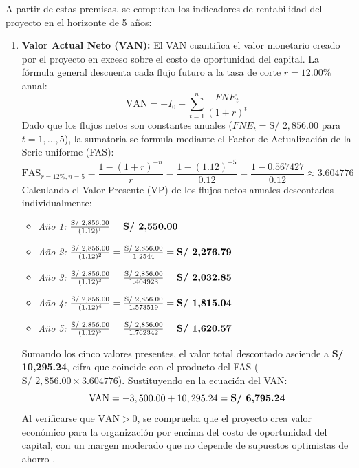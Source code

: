 A partir de estas premisas, se computan los indicadores de rentabilidad del proyecto en el horizonte de 5 años:
\begin{enumerate}[leftmargin=1.27cm, label=\alph*)]
    \item \textbf{Valor Actual Neto (VAN):} El VAN cuantifica el valor monetario creado por el proyecto en exceso sobre el costo de oportunidad del capital. La fórmula general descuenta cada flujo futuro a la tasa de corte $r = 12.00\%$ anual:
    \begin{equation}
        \text{VAN} = -I_0 + \sum_{t=1}^{n} \frac{FNE_t}{(1 + r)^t}
    \end{equation}
    Dado que los flujos netos son constantes anuales ($FNE_t = \text{S/ } 2,856.00$ para $t = 1, \dots, 5$), la sumatoria se formula mediante el Factor de Actualización de la Serie uniforme (FAS):
    \begin{equation}
        \text{FAS}_{r=12\%, n=5} = \frac{1 - (1 + r)^{-n}}{r} = \frac{1 - (1.12)^{-5}}{0.12} = \frac{1 - 0.567427}{0.12} \approx 3.604776
    \end{equation}
    Calculando el Valor Presente (VP) de los flujos netos anuales descontados individualmente:
    \begin{itemize}
        \item \textit{Año 1:} $\frac{\text{S/ } 2,856.00}{(1.12)^1} = \text{\textbf{S/ 2,550.00}}$
        \item \textit{Año 2:} $\frac{\text{S/ } 2,856.00}{(1.12)^2} = \frac{\text{S/ } 2,856.00}{1.2544} = \text{\textbf{S/ 2,276.79}}$
        \item \textit{Año 3:} $\frac{\text{S/ } 2,856.00}{(1.12)^3} = \frac{\text{S/ } 2,856.00}{1.404928} = \text{\textbf{S/ 2,032.85}}$
        \item \textit{Año 4:} $\frac{\text{S/ } 2,856.00}{(1.12)^4} = \frac{\text{S/ } 2,856.00}{1.573519} = \text{\textbf{S/ 1,815.04}}$
        \item \textit{Año 5:} $\frac{\text{S/ } 2,856.00}{(1.12)^5} = \frac{\text{S/ } 2,856.00}{1.762342} = \text{\textbf{S/ 1,620.57}}$
    \end{itemize}
    Sumando los cinco valores presentes, el valor total descontado asciende a \textbf{S/ 10,295.24}, cifra que coincide con el producto del FAS ($\text{S/ } 2,856.00 \times 3.604776$). Sustituyendo en la ecuación del VAN:
    \begin{equation}
        \text{VAN} = -3,500.00 + 10,295.24 = \text{\textbf{S/ 6,795.24}}
    \end{equation}
    Al verificarse que $\text{VAN} > 0$, se comprueba que el proyecto crea valor económico para la organización por encima del costo de oportunidad del capital, con un margen moderado que no depende de supuestos optimistas de ahorro \parencite{torres2026proyecto}. %


\end{enumerate}
